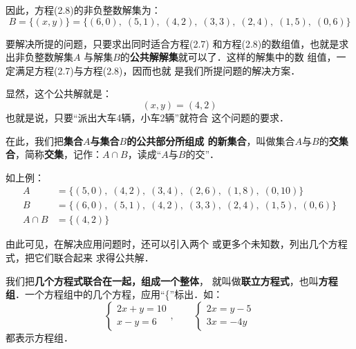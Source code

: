 因此，方程(2.8)的非负整数解集为：
\[B=\{(x,y)\} =\{(6,0),\; (5,  1),\; 
      (4, 2),\; (3,  3),\; (2,   4),\; 
      (1,5),\; (0,6)\} \]

要解决所提的问题，只要求出同时适合方程(2.7)
和方程(2.8)的数组值，也就是求出非负整数解集$A$
与解集$B$的\textbf{公共解解集}就可以了．这样的解集中的数
组值，一定满足方程(2.7)与方程(2.8)，因而也就
是我们所提问题的解决方案．

显然，这个公共解就是：
          \[(x,y)=(4, 2)\]
也就是说，只要“派出大车4辆，小车2辆”就符合
这个问题的要求．

    在此，我们把\textbf{集合$A$与集合$B$的公共部分所组成
的新集合}，叫做集合$A$与$B$的\textbf{交集合}，简称\textbf{交集}，记作：$A\cap B$，读成“$A$与$B$的交”．

    如上例：
\[\begin{split}
    A&=\{(5,  0),\; (4, 2),\; (3,  4),\;  (2,  6),\; (1,  8),\; (0,  10)\} \\
B&=\{(6,  0),\; (5,  1),\; (4,  2),\; (3,  3),\; (2,  4),\; (1, 5),\;     (0,  6)\}\\
A\cap B&=\{(4,  2)\}
\end{split}  \]

\begin{figure}[htp]
\begin{center}
\end{center}
    \caption{}
\end{figure}

由此可见，在解决应用问题时，还可以引入两个
或更多个未知数，列出几个方程式，把它们联合起来
求得公共解．

    我们把\textbf{几个方程式联合在一起，组成一个整体}，
就叫做\textbf{联立方程式}，也叫\textbf{方程组}．一个方程组中的几个方程，应用“\{”标出．如：
\[\begin{cases}
   2x+y=10\\
   x-y=6 
\end{cases},\qquad \begin{cases}
    2x=y-5\\
    3x=-4y
\end{cases}\]    
都表示方程组．

